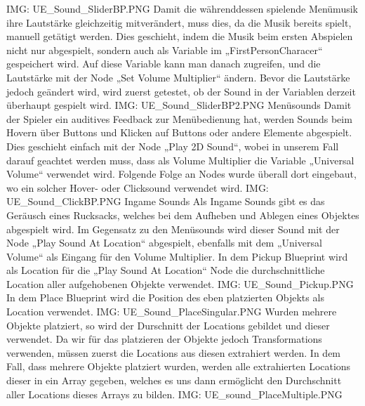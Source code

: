 {IMG: UE_Sound_SliderBP.PNG}
Damit die währenddessen spielende Menümusik ihre Lautstärke gleichzeitig mitverändert, muss dies, da die Musik bereits spielt, manuell getätigt werden.
Dies geschieht, indem die Musik beim ersten Abspielen nicht nur abgespielt, sondern auch als Variable im „FirstPersonCharacer“ gespeichert wird. Auf diese Variable kann man danach zugreifen, und die Lautstärke mit der Node „Set Volume Multiplier“ ändern. Bevor die Lautstärke jedoch geändert wird, wird zuerst getestet, ob der Sound in der Variablen derzeit überhaupt gespielt wird.
{IMG: UE_Sound_SliderBP2.PNG}
Menüsounds
Damit der Spieler ein auditives Feedback zur Menübedienung hat, werden Sounds beim Hovern über Buttons und Klicken auf Buttons oder andere Elemente abgespielt. Dies geschieht einfach mit der Node „Play 2D Sound“, wobei in unserem Fall darauf geachtet werden muss, dass als Volume Multiplier die Variable „Universal Volume“ verwendet wird. Folgende Folge an Nodes wurde überall dort eingebaut, wo ein solcher Hover- oder Clicksound verwendet wird.
{IMG: UE_Sound_ClickBP.PNG}
Ingame Sounds
Als Ingame Sounds gibt es das Geräusch eines Rucksacks, welches bei dem Aufheben und Ablegen eines Objektes abgespielt wird. Im Gegensatz zu den Menüsounds wird dieser Sound mit der Node „Play Sound At Location“ abgespielt, ebenfalls mit dem „Universal Volume“ als Eingang für den Volume Multiplier. In dem Pickup Blueprint wird als Location für die „Play Sound At Location“ Node die durchschnittliche Location aller aufgehobenen Objekte verwendet.
{IMG: UE_Sound_Pickup.PNG}
In dem Place Blueprint wird die Position des eben platzierten Objekts als Location verwendet.
{IMG: UE_Sound_PlaceSingular.PNG}
Wurden mehrere Objekte platziert, so wird der Durschnitt der Locations gebildet und dieser verwendet. Da wir für das platzieren der Objekte jedoch Transformations verwenden, müssen zuerst die Locations aus diesen extrahiert werden. In dem Fall, dass mehrere Objekte platziert wurden, werden alle extrahierten Locations dieser in ein Array gegeben, welches es uns dann ermöglicht den Durchschnitt aller Locations dieses Arrays zu bilden.
{IMG: UE_sound_PlaceMultiple.PNG}

